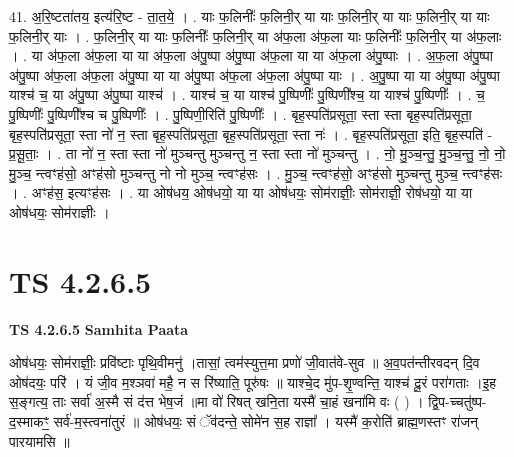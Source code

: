 \documentclass[17pt]{extarticle}
\begin{document}
41. अ॒रि॒ष्टता॑तय॒ इत्य॑रि॒ष्ट - ता॒त॒ये॒ । . याः फ॒लिनीः᳚ फ॒लिनी॒र् या याः फ॒लिनी॒र् या याः फ॒लिनी॒र् या याः फ॒लिनी॒र् याः । . फ॒लिनी॒र् या याः फ॒लिनीः᳚ फ॒लिनी॒र् या अ॑फ॒ला अ॑फ॒ला याः फ॒लिनीः᳚ फ॒लिनी॒र् या अ॑फ॒लाः । . या अ॑फ॒ला अ॑फ॒ला या या अ॑फ॒ला अ॑पु॒ष्पा अ॑पु॒ष्पा अ॑फ॒ला या या अ॑फ॒ला अ॑पु॒ष्पाः । . अ॒फ॒ला अ॑पु॒ष्पा अ॑पु॒ष्पा अ॑फ॒ला अ॑फ॒ला अ॑पु॒ष्पा या या अ॑पु॒ष्पा अ॑फ॒ला अ॑फ॒ला अ॑पु॒ष्पा याः । . अ॒पु॒ष्पा या या अ॑पु॒ष्पा अ॑पु॒ष्पा याश्च॑ च॒ या अ॑पु॒ष्पा अ॑पु॒ष्पा याश्च॑ । . याश्च॑ च॒ या याश्च॑ पु॒ष्पिणीः᳚ पु॒ष्पिणी᳚श्च॒ या याश्च॑ पु॒ष्पिणीः᳚ । . च॒ पु॒ष्पिणीः᳚ पु॒ष्पिणी᳚श्च च पु॒ष्पिणीः᳚ । . पु॒ष्पिणी॒रिति॑ पु॒ष्पिणीः᳚ । . बृह॒स्पति॑प्रसूता॒ स्ता स्ता बृह॒स्पति॑प्रसूता॒ बृह॒स्पति॑प्रसूता॒ स्ता नो॑ न॒ स्ता बृह॒स्पति॑प्रसूता॒ बृह॒स्पति॑प्रसूता॒ स्ता नः॑ । . बृह॒स्पति॑प्रसूता॒ इति॒ बृह॒स्पति॑ - प्र॒सू॒ताः॒ । . ता नो॑ न॒ स्ता स्ता नो॑ मुञ्चन्तु मुञ्चन्तु न॒ स्ता स्ता नो॑ मुञ्चन्तु । . नो॒ मु॒ञ्च॒न्तु॒ मु॒ञ्च॒न्तु॒ नो॒ नो॒ मु॒ञ्च॒ न्त्वꣳह॑सो॒ अꣳह॑सो मुञ्चन्तु नो नो मुञ्च॒ न्त्वꣳह॑सः । . मु॒ञ्च॒ न्त्वꣳह॑सो॒ अꣳह॑सो मुञ्चन्तु मुञ्च॒ न्त्वꣳह॑सः । . अꣳह॑स॒ इत्यꣳह॑सः । . या ओष॑धय॒ ओष॑धयो॒ या या ओष॑धयः॒ सोम॑राज्ञीः॒ सोम॑राज्ञी॒ रोष॑धयो॒ या या ओष॑धयः॒ सोम॑राज्ञीः । \newline
\pagebreak
{}

\section{ TS 4.2.6.5 }

\textbf{TS 4.2.6.5 } \newline
\textbf{Samhita Paata} \newline

ओष॑धयः॒ सोम॑राज्ञीः॒ प्रवि॑ष्टाः पृथि॒वीमनु॑ ।तासां॒ त्वम॑स्युत्त॒मा प्रणो॑ जी॒वात॑वे-सुव ॥ अ॒व॒पत॑न्तीरवदन् दि॒व ओष॑दयः॒ परि॑ । यं जी॒व म॒श्ञवा॑ महै॒ न स रि॑ष्याति॒ पूरु॑षः ॥ याश्चे॒द मु॑प-शृ॒ण्वन्ति॒ याश्च॑ दू॒रं परा॑गताः ।इ॒ह स॒ङ्गत्य॒ ताः सर्वा॑ अ॒स्मै सं द॑त्त भेष॒जं ॥मा वो॑ रिषत् खनि॒ता यस्मै॑ चा॒हं खना॑मि वः ( ) । द्वि॒प-च्चतु॑ष्प-द॒स्माकꣳ॒॒ सर्व॑-म॒स्त्वना॑तुरं ॥ ओष॑धयः॒ सं ॅव॑दन्ते॒ सोमे॑न स॒ह राज्ञा᳚ । यस्मै॑ क॒रोति॑ ब्राह्म॒णस्तꣳ रा॑जन् पारयामसि ॥ \newline
\end{document}
